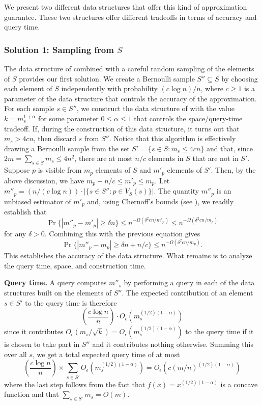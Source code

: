 \documentclass{patmorin}
\newcommand{\Oe}{O_\epsilon}
\begin{document}
We present two different data structures that offer this kind of
approximation guarantee.  These two structures offer different tradeoffs
in terms of accuracy and query time.

\subsubsection{Solution 1: Sampling from $S$}

The data structure of  combined with a careful
random sampling of the elements of $S$ provides our first solution.
We create a Bernoulli sample $S''\subseteq S$ by choosing each element
of $S$ independently with probability $(c\log n)/n$, where $c \ge 1$
is a parameter of the data structure that controls the accuracy of
the approximation.  For each sample $s\in S''$, we construct the data
structure of  with the value $k=m_s^{1+\alpha}$
for some parameter $0\le\alpha \le 1$ that controls the space/query-time
tradeoff.  If, during the construction of this data structure, it turns
out that $m_s > 4cn$, then discard $s$ from $S''$.  Notice that this
algorithm is effectively drawing a Bernoulli sample from the set
$S' = \{ s\in S : m_s \le 4cn \}$
and that, since $2m=\sum_{s\in S} m_s \le 4n^2$, there are at most $n/c$
elements in $S$ that are not in $S'$.
Suppose $p$ is visible from $m_p$ elements of $S$ and $m'_p$ elements of
$S'$.  Then, by the above discussion, we have  $m_p - n/c \le m'_p \le m_p$.
Let $m''_p= (n/(c\log n))\cdot |\{s\in S'': p\in V_S(s)\}|$.
The quantity $m''_p$ is an unbiased estimator of $m'_p$ and, using
Chernoff's bounds (see ), we readily establish that
\[
   \Pr\{|m''_p - m'_p| \ge \delta n\} \le n^{-\Omega(\delta^2cn/m'_p)}
           \le n^{-\Omega(\delta^2cn/m_p)}
\]
for any $\delta > 0$. Combining this with the previous equation gives
\[
   \Pr\{|m''_p - m_p| \ge \delta n + n/c\} \le n^{-\Omega(\delta^2 cn/m_p)}.
\]
This establishes the accuracy of the data structure.  What remains is to
analyze the query time, space, and construction time.\smallbreak

\noindent\textbf{Query time.} A query computes $m''_s$ by performing
a query in each of the data structures built on the elements of $S''$.
The expected contribution of an element $s\in S'$ to the query time is
therefore
\[
    \left(\frac{c\log n}{n}\right)\cdot\Oe\left(m_s^{(1/2)(1-\alpha)}\right)
\]
since it contributes $\Oe(m_s/\sqrt{k})=\Oe(m_s^{(1/2)(1-\alpha)})$ to the
query time if it is chosen to take part in $S''$ and it contributes
nothing otherwise.  Summing this over all $s$, we get a total expected query
time of at most
\[
     \left(\frac{c\log n}{n}\right)
         \times\sum_{s\in S'}\Oe\left(m_s^{(1/2)(1-\alpha)}\right)
     = \Oe(c(m/n)^{(1/2)(1-\alpha)})
\]
where the last step follows from the fact that $f(x)=x^{(1/2)(1-\alpha)}$
is a concave function and that $\sum_{s\in S'} m_s= O(m)$.\smallbreak
\end{document}
